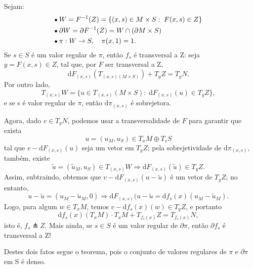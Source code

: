 \documentclass[../differential_topology.tex]{subfiles}
\begin{document}
\begin{proof*}
	Sejam:
	\begin{align*}
		 & \tikz[baseline=-0.5ex]\draw[black, fill=black, radius=1.5pt](0, 0)circle;\; W = F^{-1}(Z) = \{(x, s)\in M\times S:\; F(x, s)\in Z\}      \\
		 & \tikz[baseline=-0.5ex]\draw[black, fill=black, radius=1.5pt](0, 0)circle;\; \partial W = \partial F^{-1}(Z) = W\cap (\partial M\times S) \\
		 & \tikz[baseline=-0.5ex]\draw[black, fill=black, radius=1.5pt](0, 0)circle;\; \pi :W\rightarrow S, \quad \pi (x, 1) = 1.
	\end{align*}
	Se \(s\in S\) é um valor regular de \(\pi \), então \(f_{s}\) é transversal a Z: seja \(y = F(x, s)\in Z\), tal que, por \(F\) ser transversal a Z,
	\[
		\mathrm{d}F_{(x, s)}(T_{(x, s)(M\times S)}) + T_{y}Z = T_{y}N.
	\]
	Por outro lado,
	\[
		T_{(x, s)}W = \{u\in T_{(x, s)}(M\times S):\; \mathrm{d}F_{(x, s)}(u)\in T_{y}Z\},
	\]
	e se s é valor regular de \(\pi \), então \(\mathrm{d}\pi_{(x, s)}\) é sobrejetora.

	Agora, dado \(v\in T_{y}N\), podemos usar a transversalidade de \(F\) para garantir que exista
	\[
		u = (u_{M}, u_{S})\in T_{x}M \oplus T_{s}S
	\]
	tal que \(v-\mathrm{d}F_{(x, s)}(u)\) seja um vetor em \(T_{y}Z\); pela sobrejetividade de \(\mathrm{d}\pi_{(x, s)}\), também, existe
	\[
		\tilde{u} = (\tilde{u}_{M}, u_{S})\in T_{(x, s)}W \Rightarrow \mathrm{d}F_{(x, s)}(\tilde{u})\in T_{y}Z.
	\]
	Assim, subtraindo, obtemos que \(v-\mathrm{d}F_{(x, s)}(u-\tilde{u})\) é um vetor de \(T_{y}Z\); no entanto,
	\[
		u-\tilde{u}=(u_{M}-\tilde{u}_{M}, 0) \Rightarrow \mathrm{d}F_{(x, s)}(u-\tilde{u}=\mathrm{d}f_{s}(x)(u_{M}-\tilde{u}_{M}).
	\]
	Logo, para algum \(w\in T_{x}M\), temos \(v-\mathrm{d}f_{s}(x)(w)\in T_{y}Z\), e portanto
	\[
		\mathrm{d}f_{s}(x)(T_{x}M) \cdot T_{x}M + T_{f_s(x)}Z = T_{f_{s}(x)}N,
	\]
	isto é, \(f_{s}\pitchfork Z\).
	Mais ainda, se \(s\in S\) é um valor regular de \(\partial \pi \), então \(\partial f_{s}\) é transversal a Z!

	Destes dois fatos segue o teorema, pois o conjunto de valores regulares de \(\pi \) e \(\partial \pi \) em S é denso.
\end{proof*}
\end{document}
